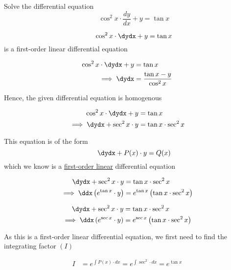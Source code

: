 \documentclass[14pt,fleqn]{extarticle}
\newcommand\intgf{ e^{\tan x}}
\newcommand\expa{\tan x\cdot\sec^2 x}
\begin{document}
\begin{problem}
\statement
	
Solve the differential equation 
\[ \qquad \cos^2 x\cdot \frac{dy}{dx} + y = \tan x \]
%

\begin{step}
  \begin{options} 
     \correct 
     \[ \qquad \cos^2 x\cdot \dydx + y = \tan  x\]
     is a first-order linear differential equation        
     \incorrect
        
        \begin{align}
	\cos^2 x\cdot\dydx + y &= \tan x \\ 
	\implies \dydx &= \dfrac{\tan x - y}{\cos^2 x} 
\end{align}

Hence, the given differential equation is homogenous
    \end{options} 
     \reason 
     
     \begin{align}
	\cos^2 x\cdot\dydx + y &= \tan x \\
	\implies \dydx + \sec^2 x\cdot y &= \expa 
\end{align}  

This equation is of the form 
\[ \qquad \dydx + P(x)\cdot y = Q(x) \]
which we know is a \underline{first-order linear} differential equation
\end{step}


\begin{step}
  \begin{options} 
     \correct 
       \begin{align}
	\dydx + \sec^2x\cdot y &= \tan x\cdot\sec^2 x \\
	\implies \ddx \left(\intgf\cdot y \right) &= \intgf \left(\expa \right)
\end{align}
     \incorrect
        
        \begin{align}
	\dydx + \sec^2x\cdot y &= \tan x\cdot\sec^2 x \\
	\implies \ddx \left(e^{\sec x}\cdot y \right) &= e^{\sec x} \left(\expa \right)
\end{align}
    \end{options} 
     \reason 
     
     As this is a first-order linear differential equation, we first need to find the integrating factor $(I)$\newline 
     
     \begin{align}
     I &= e^{\int P(x)\cdot dx} = e^{\int \sec^2\cdot dx} = \intgf 
\end{align}


\end{step}
\end{problem}
\end{document}
